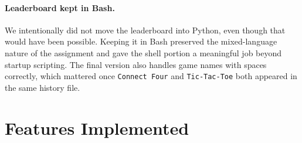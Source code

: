 \documentclass[12pt,a4paper]{article}
\begin{document}
\paragraph{Leaderboard kept in Bash.}
We intentionally did not move the leaderboard into Python, even though that would have been possible. Keeping it in Bash preserved the mixed-language nature of the assignment and gave the shell portion a meaningful job beyond startup scripting. The final version also handles game names with spaces correctly, which mattered once \texttt{Connect Four} and \texttt{Tic-Tac-Toe} both appeared in the same history file.

\section{Features Implemented}
\end{document}
